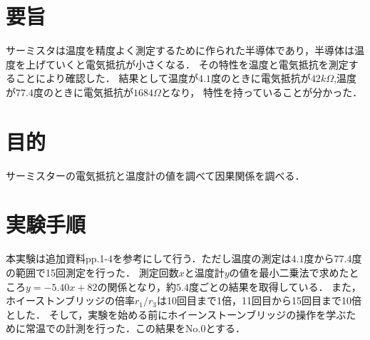 \documentclass[a4paper,11pt]{ltjsarticle}
\begin{document}
\section{要旨}
サーミスタは温度を精度よく測定するために作られた半導体であり，半導体は温度を上げていくと電気抵抗が小さくなる．
その特性を温度と電気抵抗を測定することにより確認した．
結果として温度が$4.1$度のときに電気抵抗が$42kΩ$,温度が$77.4$度のときに電気抵抗が$1684Ω$となり，
特性を持っていることが分かった．
\section{目的}
サーミスターの電気抵抗と温度計の値を調べて因果関係を調べる．
\section{実験手順}
本実験は追加資料pp.1-4を参考にして行う．ただし温度の測定は$4.1$度から$77.4$度の範囲で15回測定を行った．
測定回数$x$と温度計$y$の値を最小二乗法で求めたところ$y=-5.40x + 82$の関係となり，約$5.4$度ごとの結果を取得している．
また，ホイーストンブリッジの倍率$r_1/r_3$は10回目まで1倍，11回目から15回目まで10倍とした．
そして，実験を始める前にホイーンストーンブリッジの操作を学ぶために常温での計測を行った．この結果をNo.0とする．
\end{document}
